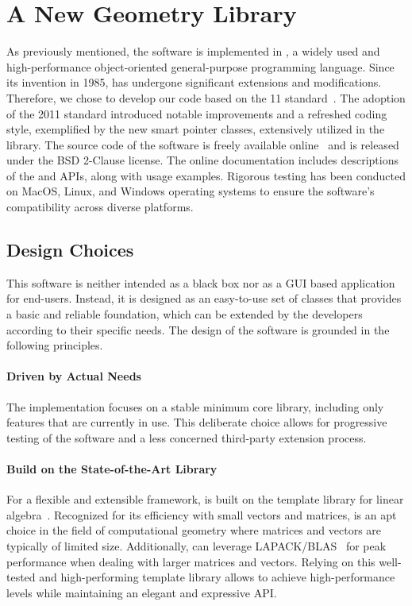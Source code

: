 
\section{A New Geometry Library}

As previously mentioned, the software is implemented in \cpp{}, a widely used and high-performance object-oriented general-purpose programming language. Since its invention
in 1985, \cpp{} has undergone significant extensions and modifications. Therefore, we chose to develop our code based on the \cpp{}11 standard~\cite{stroustrup2013cpp}. The adoption of the 2011 standard introduced notable improvements and a refreshed coding style, exemplified by the new smart pointer classes, extensively utilized in the \Acme{} library. The source code of the software is freely available online~\cite{acme} and is released under the \ac{BSD} 2-Clause license. The online documentation includes descriptions of the \cpp{} and \Matlab{} \Mex{} \acp{API}, along with usage examples. Rigorous testing has been conducted on MacOS, Linux, and Windows operating systems to ensure the software's compatibility across diverse platforms.

\subsection{Design Choices}

This software is neither intended as a black box nor as a \ac{GUI} based application for end-users. Instead, it is designed as an easy-to-use set of \cpp{} classes that provides a basic and reliable foundation, which can be extended by the developers according to their specific needs. The design of the software is grounded in the following principles.

\paragraph{Driven by Actual Needs}
The implementation focuses on a stable minimum core library, including only features that are currently in use. This deliberate choice allows for progressive testing of the software and a less concerned third-party extension process.

\paragraph{Build on the State-of-the-Art \Eigen{} Library}
For a flexible and extensible framework, \Acme{} is built on the \Eigen{} template library for linear algebra~\cite{eigen2010eigen}. Recognized for its efficiency with small vectors and matrices, \Eigen{} is an apt choice in the field of computational geometry where matrices and vectors are typically of limited size. Additionally, \Eigen{} can leverage \ac{LAPACK}/\ac{BLAS}~\cite{anderson1999lapack} for peak performance when dealing with larger matrices and vectors. Relying on this well-tested and high-performing template library allows \Acme{} to achieve high-performance levels while maintaining an elegant and expressive \ac{API}.

